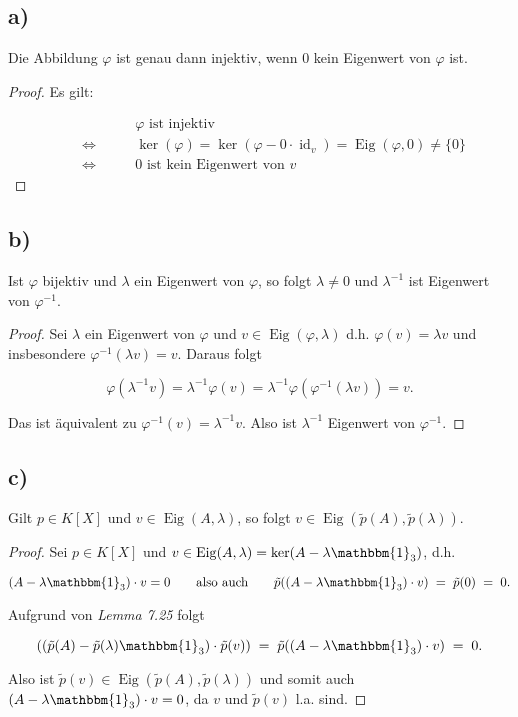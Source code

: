 \documentclass{article}
\DeclareMathOperator{\id}{id}
\DeclareMathOperator{\Kern}{ker}
\DeclareMathOperator{\eigenraum}{Eig}
\begin{document}
\subsection*{a)}

Die Abbildung $\varphi$ ist genau dann injektiv,
wenn $0$ kein Eigenwert von $\varphi$ ist.

\begin{proof}
Es gilt:

\[
\begin{aligned}
  &\text{$\varphi$ ist injektiv}\\
  \qquad\Leftrightarrow\qquad
  &\Kern(\varphi) = \Kern(\varphi - 0 \cdot \id_v) = \eigenraum(\varphi, 0) \neq \{0\}\\
  \qquad\Leftrightarrow\qquad
  &\text{$0$ ist kein Eigenwert von $v$}
\end{aligned}
\]
\end{proof}

\subsection*{b)}

Ist $\varphi$ bijektiv und $\lambda$ ein Eigenwert von $\varphi$,
so folgt
$\lambda \neq 0$
und $\lambda^{-1}$ ist Eigenwert von $\varphi^{-1}$.

\begin{proof}
  Sei $\lambda$ ein Eigenwert von $\varphi$
  und $v \in \eigenraum(\varphi, \lambda)$ d.h.
  $\varphi(v) = \lambda v$ und insbesondere $\varphi^{-1}(\lambda v) = v$.
  Daraus folgt

  \[
  \varphi(\lambda^{-1} v)
  = \lambda^{-1} \varphi(v)
  = \lambda^{-1} \varphi(\varphi^{-1}(\lambda v))
  = v.
  \]

  Das ist äquivalent zu $\varphi^{-1}(v) = \lambda^{-1} v$.
  Also ist $\lambda^{-1}$ Eigenwert von $\varphi^{-1}$.
\end{proof}

\subsection*{c)}

Gilt
$p \in K[X]$
und
$v \in \eigenraum(A, \lambda)$,
so folgt
$v \in \eigenraum(\tilde{p}(A), \tilde{p}(\lambda))$.

\begin{proof}
  Sei $p \in K[X]$
  und
  $v \in \eigenraum(A, \lambda) = \Kern(A - \lambda \mathbbm{1}_3)$,
  d.h.

  \[
  (A - \lambda \mathbbm{1}_3) \cdot v = 0
  \qquad\text{also auch}\qquad
  \tilde{p}((A - \lambda \mathbbm{1}_3) \cdot v) \;=\; \tilde{p}(0) \;=\; 0.
  \]

  Aufgrund von \textit{Lemma 7.25} folgt

  \[
  ((\tilde{p}(A) -\tilde{p}(\lambda) \mathbbm{1}_3) \cdot \tilde{p}(v))
  \;=\;
  \tilde{p}((A - \lambda \mathbbm{1}_3) \cdot v)
  \;=\;
  0.
  \]

  Also ist $\tilde{p}(v) \in \eigenraum(\tilde{p}(A), \tilde{p}(\lambda))$
  und somit auch $(A - \lambda \mathbbm{1}_3) \cdot v = 0$,
  da $v$ und $\tilde{p}(v)$ l.a. sind.
\end{proof}
\end{document}

